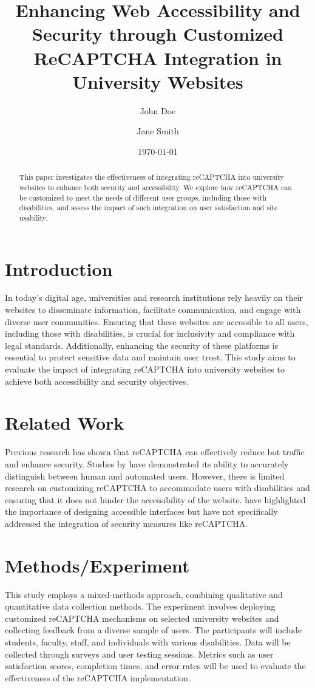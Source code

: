 \documentclass[12pt]{article}
\title{Enhancing Web Accessibility and Security through Customized ReCAPTCHA Integration in University Websites}
\author{John Doe \and Jane Smith}
\date{\today}
\begin{document}
\maketitle

\begin{abstract}
This paper investigates the effectiveness of integrating reCAPTCHA into university websites to enhance both security and accessibility. We explore how reCAPTCHA can be customized to meet the needs of different user groups, including those with disabilities, and assess the impact of such integration on user satisfaction and site usability.
\end{abstract}

\section{Introduction}
In today's digital age, universities and research institutions rely heavily on their websites to disseminate information, facilitate communication, and engage with diverse user communities. Ensuring that these websites are accessible to all users, including those with disabilities, is crucial for inclusivity and compliance with legal standards. Additionally, enhancing the security of these platforms is essential to protect sensitive data and maintain user trust. This study aims to evaluate the impact of integrating reCAPTCHA into university websites to achieve both accessibility and security objectives.

\section{Related Work}
Previous research has shown that reCAPTCHA can effectively reduce bot traffic and enhance security. Studies by \cite{reCaptchaResearch} have demonstrated its ability to accurately distinguish between human and automated users. However, there is limited research on customizing reCAPTCHA to accommodate users with disabilities and ensuring that it does not hinder the accessibility of the website. \cite{accessibilityStudies} have highlighted the importance of designing accessible interfaces but have not specifically addressed the integration of security measures like reCAPTCHA.

\section{Methods/Experiment}
This study employs a mixed-methods approach, combining qualitative and quantitative data collection methods. The experiment involves deploying customized reCAPTCHA mechanisms on selected university websites and collecting feedback from a diverse sample of users. The participants will include students, faculty, staff, and individuals with various disabilities. Data will be collected through surveys and user testing sessions. Metrics such as user satisfaction scores, completion times, and error rates will be used to evaluate the effectiveness of the reCAPTCHA implementation.
\end{document}
